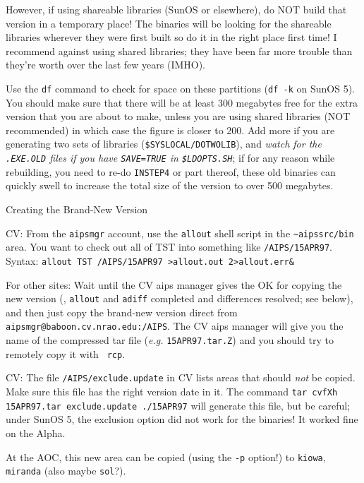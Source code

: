 However, if using shareable libraries (SunOS or elsewhere), do NOT build
that version in a temporary place!  The binaries will be looking for the
shareable libraries wherever they were first built so do it in the right
place first time!  I recommend against using shared libraries; they have
been far more trouble than they're worth over the last few years (IMHO).

Use the {\tt df} command to check for space on these partitions ({\tt df
-k} on SunOS 5).  You should make sure that there will be at least 300
megabytes free for the extra version that you are about to make, unless
you are using shared libraries (NOT recommended) in which case the
figure is closer to 200.  Add more if you are generating two sets of
libraries ({\tt\$SYSLOCAL/DOTWOLIB}), and {\it watch for the\/ {\tt
.EXE.OLD} files if you have\/ {\tt SAVE=TRUE} in\/ {\tt\$LDOPTS.SH}}; if
for any reason while rebuilding, you need to re-do {\tt INSTEP4} or part
thereof, these old binaries can quickly swell to increase the total size
of the version to over 500 megabytes.

\newsubsection Creating the Brand-New Version

\item{CV:}  From the {\tt aipsmgr} account, use the {\tt allout}
shell script in the {\tt \~{}aipssrc/bin} area.  You want to check out
all of TST into something like {\tt /AIPS/15APR97}.  Syntax: {\tt allout
TST /AIPS/15APR97 >allout.out 2>allout.err\&}

\noindent For other sites: Wait until the CV aips manager gives the OK
for copying the new version (\ie, {\tt allout} and {\tt adiff} completed
and differences resolved; see below), and then just copy the brand-new
version direct from {\tt aipsmgr@baboon.cv.nrao.edu:/AIPS}.  The CV aips
manager will give you the name of the compressed tar file ({\it e.g.\/}
{\tt 15APR97.tar.Z}) and you should try to remotely copy it with {\tt
rcp}.

\item{CV:} The file {\tt /AIPS/exclude.update} in CV lists areas that
	   should {\it not\/} be copied.  Make sure this file has the
	   right version date in it.  The command {\tt tar cvfXh
	   15APR97.tar exclude.update ./15APR97} will generate this
	   file, but be careful; under SunOS 5, the exclusion option did
	   not work for the binaries!  It worked fine on the Alpha.

\medskip\noindent At the AOC, this new area can be copied (using the
{\tt -p} option!) to {\tt kiowa}, {\tt miranda} (also maybe {\tt sol}?).

